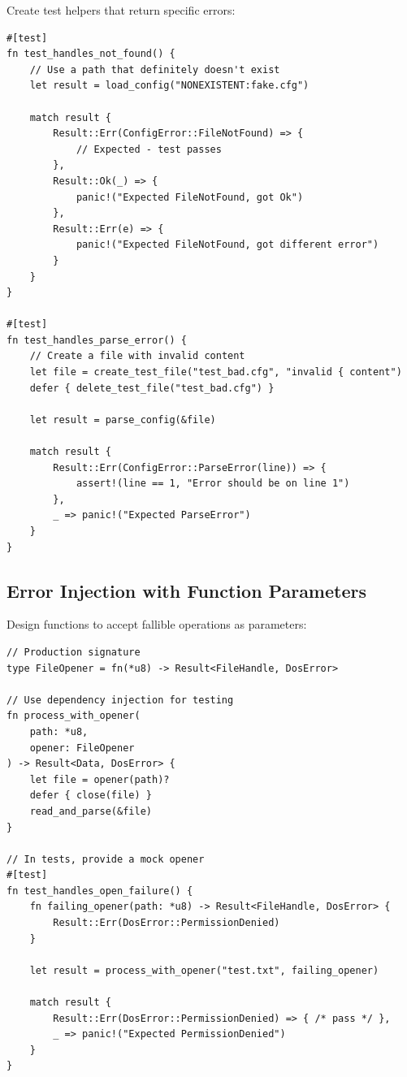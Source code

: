 Create test helpers that return specific errors:

\begin{lstlisting}
#[test]
fn test_handles_not_found() {
    // Use a path that definitely doesn't exist
    let result = load_config("NONEXISTENT:fake.cfg")

    match result {
        Result::Err(ConfigError::FileNotFound) => {
            // Expected - test passes
        },
        Result::Ok(_) => {
            panic!("Expected FileNotFound, got Ok")
        },
        Result::Err(e) => {
            panic!("Expected FileNotFound, got different error")
        }
    }
}

#[test]
fn test_handles_parse_error() {
    // Create a file with invalid content
    let file = create_test_file("test_bad.cfg", "invalid { content")
    defer { delete_test_file("test_bad.cfg") }

    let result = parse_config(&file)

    match result {
        Result::Err(ConfigError::ParseError(line)) => {
            assert!(line == 1, "Error should be on line 1")
        },
        _ => panic!("Expected ParseError")
    }
}
\end{lstlisting}

\subsection{Error Injection with Function Parameters}

Design functions to accept fallible operations as parameters:

\begin{lstlisting}
// Production signature
type FileOpener = fn(*u8) -> Result<FileHandle, DosError>

// Use dependency injection for testing
fn process_with_opener(
    path: *u8,
    opener: FileOpener
) -> Result<Data, DosError> {
    let file = opener(path)?
    defer { close(file) }
    read_and_parse(&file)
}

// In tests, provide a mock opener
#[test]
fn test_handles_open_failure() {
    fn failing_opener(path: *u8) -> Result<FileHandle, DosError> {
        Result::Err(DosError::PermissionDenied)
    }

    let result = process_with_opener("test.txt", failing_opener)

    match result {
        Result::Err(DosError::PermissionDenied) => { /* pass */ },
        _ => panic!("Expected PermissionDenied")
    }
}
\end{lstlisting}

